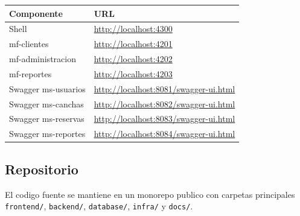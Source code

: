 \documentclass[12pt,a4paper]{article}
\begin{document}
\begin{longtable}{p{5cm}p{8cm}}
\textbf{Componente} & \textbf{URL} \\
\hline
Shell & \url{http://localhost:4300} \\
mf-clientes & \url{http://localhost:4201} \\
mf-administracion & \url{http://localhost:4202} \\
mf-reportes & \url{http://localhost:4203} \\
Swagger ms-usuarios & \url{http://localhost:8081/swagger-ui.html} \\
Swagger ms-canchas & \url{http://localhost:8082/swagger-ui.html} \\
Swagger ms-reservas & \url{http://localhost:8083/swagger-ui.html} \\
Swagger ms-reportes & \url{http://localhost:8084/swagger-ui.html} \\
\end{longtable}

\subsection{Repositorio}

El codigo fuente se mantiene en un monorepo publico con carpetas principales \texttt{frontend/}, \texttt{backend/}, \texttt{database/}, \texttt{infra/} y \texttt{docs/}.
\end{document}
